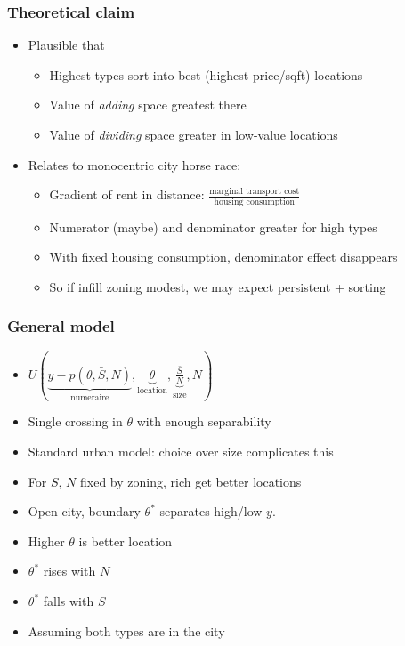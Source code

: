 \documentclass{beamer}
\begin{document}
\begin{frame}
	\frametitle{Theoretical claim}
	\begin{itemize}
		\item Plausible that
			\begin{itemize}
				\item Highest types sort into best (highest price/sqft) locations
				\item Value of \emph{adding} space greatest there
				\item Value of \emph{dividing} space greater in low-value locations
			\end{itemize}
		\item Relates to monocentric city horse race:
			\begin{itemize}
				\item Gradient of rent in distance: $\frac{\text{marginal transport cost}}{\text{housing consumption}}$
				\item Numerator (maybe) and denominator greater for high types
				\item With fixed housing consumption, denominator effect disappears
				\item So if infill zoning modest, we may expect persistent + sorting
			\end{itemize}
	\end{itemize}
\end{frame}

\begin{frame}
	\frametitle{General model}
	\begin{itemize} 
		\item $U\left(\underbrace{y-p\left(\theta,\bar{S},{N}\right)}_{\text{numeraire}},\underbrace{\theta}_{\text{location}},\underbrace{\frac{\bar{S}}{N}}_{\text{size}},N\right)$
		\item Single crossing in $\theta$ with enough separability
		\item Standard urban model: choice over size complicates this
		\item For $S$, $N$ fixed by zoning, rich get better locations
		\item Open city, boundary $\theta^{*}$ separates high/low $y$.
		\item Higher $\theta$ is better location
		\item $\theta^{*}$ rises with $N$ 
		\item $\theta^{*}$ falls with $S$
		\item Assuming both types are in the city
	\end{itemize}
\end{frame}
\end{document}

